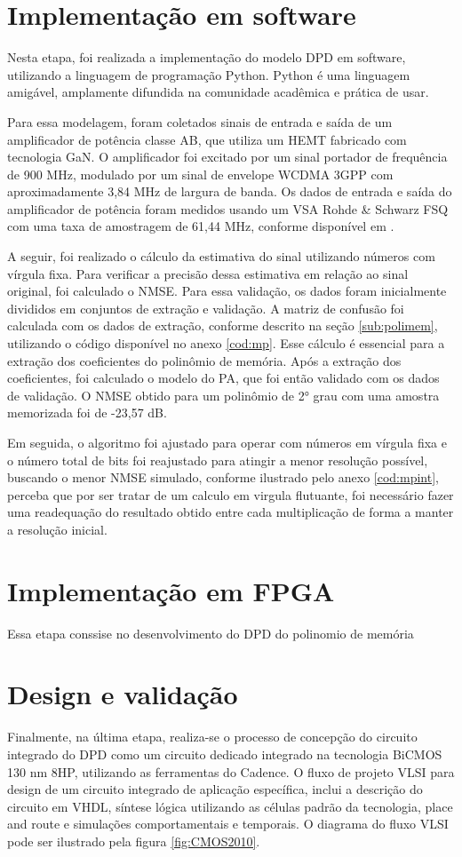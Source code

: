 \section{Implementação em software}

Nesta etapa, foi realizada a implementação do modelo DPD em software, utilizando a linguagem de programação Python. Python é uma linguagem amigável, amplamente difundida na comunidade acadêmica e prática de usar.

Para essa modelagem, foram coletados sinais de entrada e saída de um amplificador de potência classe AB, que utiliza um HEMT fabricado com tecnologia GaN. O amplificador foi excitado por um sinal portador de frequência de 900 MHz, modulado por um sinal de envelope WCDMA 3GPP com aproximadamente 3,84 MHz de largura de banda. Os dados de entrada e saída do amplificador de potência foram medidos usando um VSA Rohde \& Schwarz FSQ com uma taxa de amostragem de 61,44 MHz, conforme disponível em \cite{Bonfim2016}.

A seguir, foi realizado o cálculo da estimativa do sinal utilizando números com vírgula fixa. Para verificar a precisão dessa estimativa em relação ao sinal original, foi calculado o NMSE. Para essa validação, os dados foram inicialmente divididos em conjuntos de extração e validação. A matriz de confusão foi calculada com os dados de extração, conforme descrito na seção \ref{sub:polimem}, utilizando o código disponível no anexo \ref{cod:mp}. Esse cálculo é essencial para a extração dos coeficientes do polinômio de memória. Após a extração dos coeficientes, foi calculado o modelo do PA, que foi então validado com os dados de validação. O NMSE obtido para um polinômio de 2° grau com uma amostra memorizada foi de -23,57 dB.

Em seguida, o algoritmo foi ajustado para operar com números em vírgula fixa e o número total de bits foi reajustado para atingir a menor resolução possível, buscando o menor NMSE simulado, conforme ilustrado pelo anexo \ref{cod:mpint}, perceba que por ser tratar de um calculo em virgula flutuante, foi necessário fazer uma readequação do resultado obtido entre cada multiplicação de forma a manter a resolução inicial.

\section{Implementação em FPGA}
Essa etapa conssise no desenvolvimento do DPD do polinomio de memória 

\section{Design e validação}
Finalmente, na última etapa, realiza-se o processo de concepção do circuito integrado do DPD como um circuito dedicado integrado na tecnologia BiCMOS 130 nm 8HP, utilizando as ferramentas do Cadence.
O fluxo de projeto VLSI  para design de um circuito integrado de aplicação específica, inclui a descrição do circuito em VHDL, síntese lógica utilizando as células padrão da tecnologia, place and route e simulações comportamentais e temporais. O diagrama do fluxo VLSI pode ser ilustrado pela figura \ref{fig:CMOS2010}.

